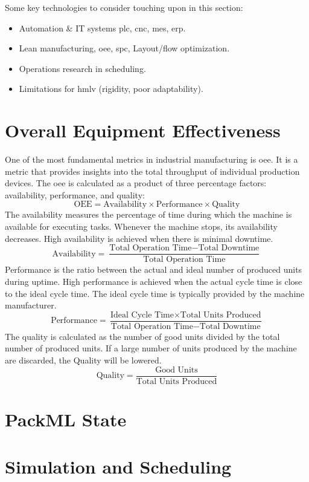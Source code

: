Some key technologies to consider touching upon in this section:
\begin{itemize}
  \item Automation \& IT systems \ac{plc}, \ac{cnc}, \ac{mes}, \ac{erp}.
  \item Lean manufacturing, \ac{oee}, \ac{spc}, Layout/flow optimization.
    \item Operations research in scheduling.
    \item Limitations for \ac{hmlv} (rigidity, poor adaptability).
\end{itemize}

\section{Overall Equipment Effectiveness}\label{sec:oee}
One of the most fundamental metrics in industrial manufacturing is \ac{oee}. 
It is a metric that provides insights into the total throughput of individual production devices.
The \ac{oee} is calculated as a product of three percentage factors: availability, performance, and quality:
\[
\text{OEE} = \text{Availability} \times \text{Performance} \times \text{Quality}
\]
The availability measures the percentage of time during which the machine is available for executing tasks.
Whenever the machine stops, its availability decreases.
High availability is achieved when there is minimal downtime.
\[
\text{Availability} = \frac{\text{Total Operation Time} - \text{Total Downtime}}{\text{Total Operation Time}}
\]
Performance is the ratio between the actual and ideal number of produced units during uptime.
High performance is achieved when the actual cycle time is close to the ideal cycle time.
The ideal cycle time is typically provided by the machine manufacturer.
\[
\text{Performance} = \frac{\text{Ideal Cycle Time} \times \text{Total Units Produced}}{\text{Total Operation Time} - \text{Total Downtime}}
\]
The quality is calculated as the number of good units divided by the total number of produced units.
If a large number of units produced by the machine are discarded, the Quality will be lowered.
\[
\text{Quality} = \frac{\text{Good Units}}{\text{Total Units Produced}}
\]

\section{PackML State}

\section{Simulation and Scheduling}\label{sec:simulation-and-scheduling}

